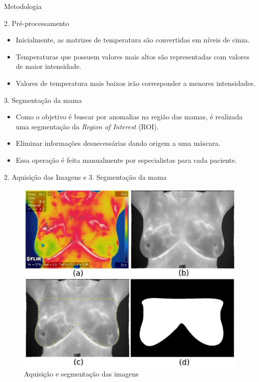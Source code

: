 \documentclass[apesctratio=169]{beamer}
\begin{document}
	\begin{frame}{Metodologia}
	    \begin{block}{2. Pré-processamento}
	             \begin{itemize}
	                 \item Inicialmente, as matrizes de temperatura são convertidas em níveis de cinza.
	                 \item Temperaturas que possuem valores mais altos são representadas com valores de maior intensidade.
	                 \item Valores de temperatura mais baixos irão corresponder a menores intensidades.
	            \end{itemize}
	   \end{block}
	   
	   \begin{block}{3. Segmentação da mama}
	             \begin{itemize}
	                 \item Como o objetivo é buscar por anomalias na região das mamas, é realizada uma segmentação da \textit{Region of Interest} (ROI).
	                 \item Eliminar informações desnecessárias dando origem a uma máscara.
	                 \item Essa operação é feita manualmente por especialistas para cada paciente.
	            \end{itemize}
	   \end{block}
	\end{frame}
	
	\begin{frame}{2. Aquisição das Imagens e 3. Segmentação da mama}
        \begin{figure}[H]
			     \includegraphics[scale=0.5]{etapa23.PNG}
			     \caption{Aquisição e segmentação das imagens}
		\end{figure}
	\end{frame}
	
\end{document}
